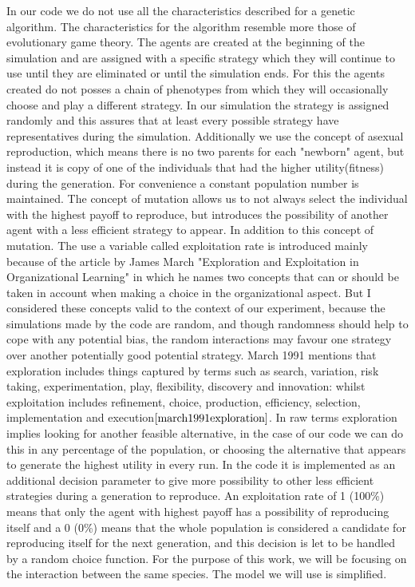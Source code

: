 \documentclass{book}
\begin{document}
In our code we do not use all the characteristics described for a genetic algorithm. The characteristics for the algorithm resemble more those of evolutionary game theory. The agents are created at the beginning of the simulation and are assigned with a specific strategy which they will continue to use until they are eliminated or until the simulation ends. For this the agents created do not posses a chain of phenotypes from which they will occasionally choose and play a different strategy. In our simulation the strategy is assigned randomly and this assures that at least every possible strategy have representatives during the simulation. Additionally we use the concept of asexual reproduction, which means there is no two parents for each "newborn" agent, but instead it is copy of one of the individuals that had the higher utility(fitness) during the generation. For convenience a constant population number is maintained. The concept of mutation allows us to not always select the individual with the highest payoff to reproduce, but introduces the possibility of another agent with a less efficient strategy to appear. In addition to this concept of mutation. The use a variable called exploitation rate is introduced mainly because of the article by James March "Exploration and Exploitation in Organizational Learning" in which he names two concepts that can or should be taken in account when making a choice in the organizational aspect. But I considered these concepts valid to the context of our experiment, because the simulations made by the code are random, and though randomness should help to cope with any potential bias, the random interactions may favour one strategy over another potentially good potential strategy. March 1991 mentions that exploration includes things captured by terms such as search, variation, risk taking, experimentation, play, flexibility, discovery and innovation: whilst exploitation includes refinement, choice, production, efficiency, selection, implementation and execution$\cite{march1991exploration}$. In raw terms exploration implies looking for another feasible alternative, in the case of our code we can do this in any percentage of the population, or choosing the alternative that appears to generate the highest utility in every run. In the code it is implemented as  an additional decision parameter to give more possibility to other less efficient strategies during a generation to reproduce. An exploitation rate of 1 (100\%) means that only the agent with highest payoff has a possibility of reproducing itself and a 0 (0\%) means that the whole population is considered a candidate for reproducing itself for the next generation, and this decision is let to be handled by a random choice function. For the purpose of this work, we will be focusing on the interaction between the same species. The model we will use is simplified.
\end{document}
